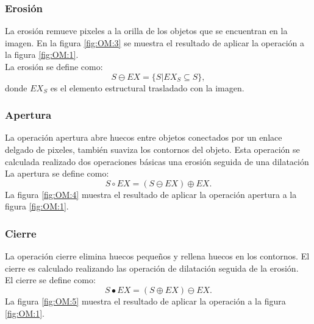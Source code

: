 \subsubsection{Erosión}\label{sssec:OMerosion}
La erosión remueve pixeles a la orilla de los objetos que se encuentran en la imagen. En la figura \ref{fig:OM:3} se muestra el resultado de aplicar la operación a la figura \ref{fig:OM:1}.\\ 
La erosión se define como: 
$$S \ominus EX = \lbrace S|EX_S \subseteq S \rbrace,$$ 
donde $EX_S$ es el elemento estructural trasladado con la imagen. 

\subsubsection{Apertura}\label{sssec:Opening} 
La operación apertura abre huecos entre objetos conectados por un enlace delgado de pixeles, también suaviza los contornos del objeto. Esta operación se calculada realizado dos operaciones básicas una erosión seguida de una dilatación \\ 
La apertura se define como:  
$$S \circ EX = (S \ominus EX) \oplus EX.$$ 
La figura \ref{fig:OM:4} muestra el resultado de aplicar la operación apertura a la figura \ref{fig:OM:1}.

\subsubsection{Cierre}\label{sssec:Closure}
La operación cierre elimina huecos pequeños y rellena huecos en los contornos. El cierre es calculado realizando las operación de dilatación seguida de la erosión.\\
El cierre se define como:
$$S \bullet EX = (S \oplus EX) \ominus EX.$$
La figura \ref{fig:OM:5} muestra el resultado de aplicar la operación a la figura \ref{fig:OM:1}.

